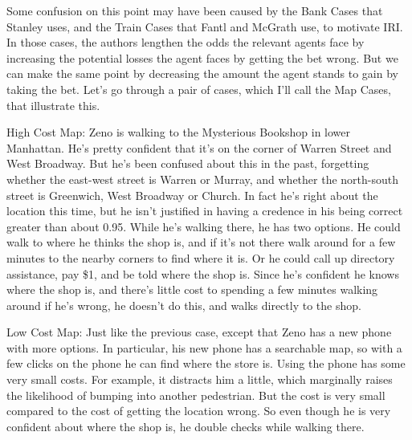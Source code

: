 Some confusion on this point may have been caused by the Bank Cases that Stanley uses, and the Train Cases that Fantl and McGrath use, to motivate IRI. In those cases, the authors lengthen the odds the relevant agents face by increasing the potential losses the agent faces by getting the bet wrong. But we can make the same point by decreasing the amount the agent stands to gain by taking the bet. Let's go through a pair of cases, which I'll call the Map Cases, that illustrate this.

\begin{description*}
\item[High Cost Map:] Zeno is walking to the Mysterious Bookshop in lower Manhattan. He's pretty confident that it's on the corner of Warren Street and West Broadway. But he's been confused about this in the past, forgetting whether the east-west street is Warren or Murray, and whether the north-south street is Greenwich, West Broadway or Church. In fact he's right about the location this time, but he isn't justified in having a credence in his being correct greater than about 0.95. While he's walking there, he has two options. He could walk to where he thinks the shop is, and if it's not there walk around for a few minutes to the nearby corners to find where it is. Or he could call up directory assistance, pay \$1, and be told where the shop is. Since he's confident he knows where the shop is, and there's little cost to spending a few minutes walking around if he's wrong, he doesn't do this, and walks directly to the shop.
\item[Low Cost Map:] Just like the previous case, except that Zeno has a new phone with more options. In particular, his new phone has a searchable map, so with a few clicks on the phone he can find where the store is. Using the phone has some very small costs. For example, it distracts him a little, which marginally raises the likelihood of bumping into another pedestrian. But the cost is very small compared to the cost of getting the location wrong. So even though he is very confident about where the shop is, he double checks while walking there.
\end{description*}

